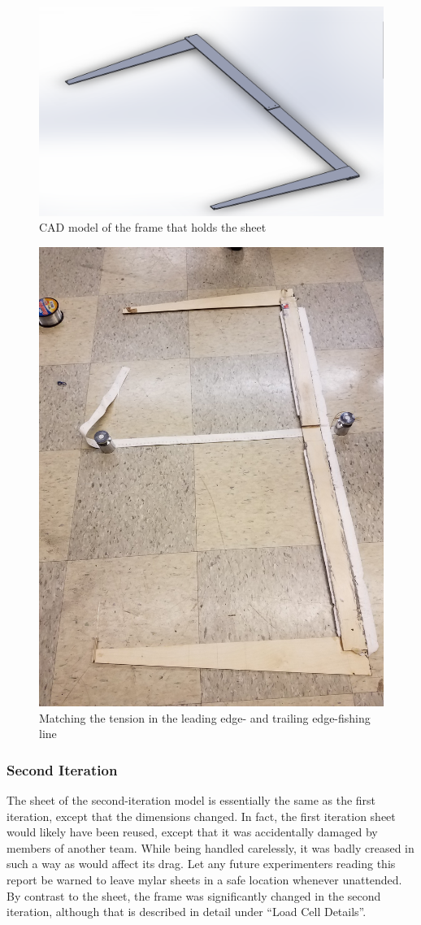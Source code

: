 \documentclass[12pt]{report} %
\begin{document}
\begin{figure}
\includegraphics[width = 0.7\linewidth]{frame.png}
\centering
\caption{CAD model of the frame that holds the sheet}
\label{frame}
\end{figure}

\begin{figure}
\includegraphics[width = 0.7\linewidth]{20x40flyingleaf.jpg}
\centering
\caption{Matching the tension in the leading edge- and trailing edge-fishing line}
\label{tension_matching}
\end{figure}

\subsubsection{Second Iteration}

The sheet of the second-iteration model is essentially the same as the first iteration, except that the dimensions changed. In fact, the
first iteration sheet would likely have been reused, except that it was accidentally damaged by members of another team. While being handled
carelessly, it was badly creased in such a way as would affect its drag. Let any future experimenters reading this report be warned to leave
mylar sheets in a safe location whenever unattended. By contrast to the sheet, the frame was significantly changed in the second iteration,
although that is described in detail under ``Load Cell Details''.
\end{document}
